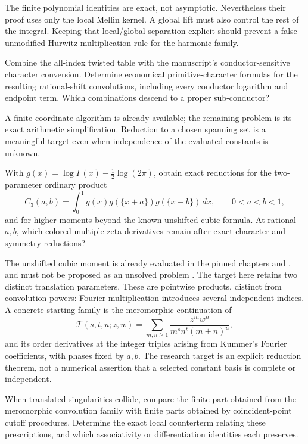 The finite polynomial identities are exact, not asymptotic.
Nevertheless their proof uses only the local Mellin kernel. A
global lift must also control the rest of the integral. Keeping
that local/global separation explicit should prevent a false
unmodified Hurwitz multiplication rule for the harmonic family.

\begin{question}
\label{future:q:characters}
Combine the all-index twisted table with the manuscript's
conductor-sensitive character conversion. Determine economical
primitive-character formulas for the resulting rational-shift
convolutions, including every conductor logarithm and endpoint
term. Which combinations descend to a proper sub-conductor?
\end{question}

A finite coordinate algorithm is already available; the remaining
problem is its exact arithmetic simplification. Reduction to a
chosen spanning set is a meaningful target even when independence
of the evaluated constants is unknown.

\begin{question}
\label{future:q:moments}
With \(g(x)=\log\Gamma(x)-\tfrac12\log(2\pi)\), obtain exact reductions
for the two-parameter ordinary product
\[
 C_3(a,b)=\int_0^1g(x)g(\{x+a\})g(\{x+b\})\,dx,
 \qquad 0<a<b<1,
\]
and for higher moments beyond the known unshifted cubic formula.
At rational \(a,b\), which colored multiple-zeta derivatives remain
after exact character and symmetry reductions?
\end{question}

The unshifted cubic moment is already evaluated in the pinned chapters
 and ,
and must not be proposed as an unsolved problem
\cite{RepoManuscript}. The target here retains two distinct translation
parameters. These are pointwise products, distinct from convolution
powers: Fourier multiplication introduces several independent indices.
A concrete starting family is the meromorphic continuation of
\[
 \mathcal T(s,t,u;z,w)=
 \sum_{m,n\geq1}\frac{z^mw^n}{m^s n^t(m+n)^u},
\]
and its order derivatives at the integer triples arising from
Kummer's Fourier coefficients, with phases fixed by \(a,b\).
The research target is an explicit
reduction theorem, not a numerical assertion that a selected
constant basis is complete or independent.

\begin{question}
\label{future:q:collisions}
When translated singularities collide, compare the finite part
obtained from the meromorphic convolution family with finite parts
obtained by coincident-point cutoff procedures. Determine the
exact local counterterm relating these prescriptions, and which
associativity or differentiation identities each preserves.
\end{question}

